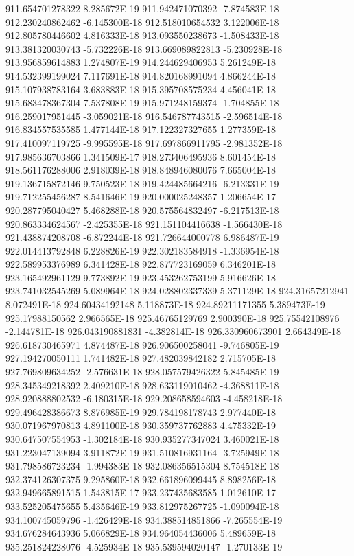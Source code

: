 911.654701278322  8.285672E-19
911.942471070392  -7.874583E-18
912.230240862462  -6.145300E-18
912.518010654532  3.122006E-18
912.805780446602  4.816333E-18
913.093550238673  -1.508433E-18
913.381320030743  -5.732226E-18
913.669089822813  -5.230928E-18
913.956859614883  1.274807E-19
914.244629406953  5.261249E-18
914.532399199024  7.117691E-18
914.820168991094  4.866244E-18
915.107938783164  3.683883E-18
915.395708575234  4.456041E-18
915.683478367304  7.537808E-19
915.971248159374  -1.704855E-18
916.259017951445  -3.059021E-18
916.546787743515  -2.596514E-18
916.834557535585  1.477144E-18
917.122327327655  1.277359E-18
917.410097119725  -9.995595E-18
917.697866911795  -2.981352E-18
917.985636703866  1.341509E-17
918.273406495936  8.601454E-18
918.561176288006  2.918039E-18
918.848946080076  7.665004E-18
919.136715872146  9.750523E-18
919.424485664216  -6.213331E-19
919.712255456287  8.541646E-19
920.000025248357  1.206654E-17
920.287795040427  5.468288E-18
920.575564832497  -6.217513E-18
920.863334624567  -2.425355E-18
921.151104416638  -1.566430E-18
921.438874208708  -6.872244E-18
921.726644000778  6.986487E-19
922.014413792848  6.228826E-19
922.302183584918  -1.336954E-18
922.589953376989  6.341428E-18
922.877723169059  6.346201E-18
923.165492961129  9.773892E-19
923.453262753199  5.916626E-18
923.741032545269  5.089964E-18
924.028802337339  5.371129E-18
924.31657212941  8.072491E-18
924.60434192148  5.118873E-18
924.89211171355  5.389473E-19
925.17988150562  2.966565E-18
925.46765129769  2.900390E-18
925.75542108976  -2.144781E-18
926.043190881831  -4.382814E-18
926.330960673901  2.664349E-18
926.618730465971  4.874487E-18
926.906500258041  -9.746805E-19
927.194270050111  1.741482E-18
927.482039842182  2.715705E-18
927.769809634252  -2.576631E-18
928.057579426322  5.845485E-19
928.345349218392  2.409210E-18
928.633119010462  -4.368811E-18
928.920888802532  -6.180315E-18
929.208658594603  -4.458218E-18
929.496428386673  8.876985E-19
929.784198178743  2.977440E-18
930.071967970813  4.891100E-18
930.359737762883  4.475332E-19
930.647507554953  -1.302184E-18
930.935277347024  3.460021E-18
931.223047139094  3.911872E-19
931.510816931164  -3.725949E-18
931.798586723234  -1.994383E-18
932.086356515304  8.754518E-18
932.374126307375  9.295860E-18
932.661896099445  8.898256E-18
932.949665891515  1.543815E-17
933.237435683585  1.012610E-17
933.525205475655  5.435646E-19
933.812975267725  -1.090094E-18
934.100745059796  -1.426429E-18
934.388514851866  -7.265554E-19
934.676284643936  5.066829E-18
934.964054436006  5.489659E-18
935.251824228076  -4.525934E-18
935.539594020147  -1.270133E-19
